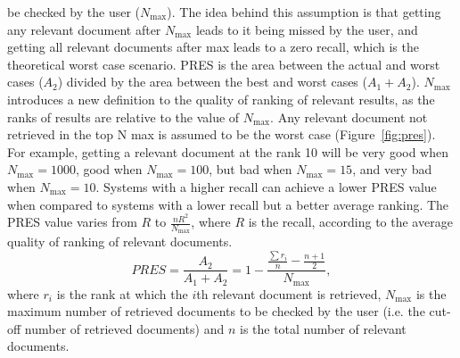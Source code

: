 be checked by the user ($ N_{\max} $). The idea behind this assumption is that getting any relevant document after $ N_{\max} $ leads to it being missed by the user, and getting all relevant documents after max leads to a zero recall, which is the theoretical worst case scenario. 
PRES is the area between the actual and worst cases ($ A_{2} $) divided by the area between the best and worst cases ($ A_{1}+A_{2} $).
$ N_{\max} $ introduces a new definition to the quality of ranking of relevant results, as the ranks of results are relative to the value of $ N_{\max} $. Any relevant document not retrieved in the top N max is assumed to be the worst case (Figure~\ref{fig:pres}).
For example, getting a relevant document at the rank 10 will be very good when $ N_{\max}=1000 $, good when $ N_{\max}=100 $, but bad when $ N_{\max}=15 $, and very bad when $ N_{\max}=10 $. Systems with a higher recall can achieve a lower PRES value when compared to systems with a lower recall but a better average ranking. The PRES value varies from $ R $ to $ \frac{nR^{2}}{N_{\max}} $, where $ R $ is the recall, according to the average quality of ranking of relevant documents.
\begin{equation}
\label{eq:pres}
PRES=\frac{A_{2}}{A_{1}+A_{2}}=1-\frac{\frac{\sum r_{i}}{n}-\frac{n+1}{2}}{N_{\max}},
\end{equation}
where $ r_{i} $ is the rank at which the $ i $th relevant document is retrieved, $ N_{\max} $ is the maximum number of retrieved documents to be checked by the user (i.e. the cut-off number of retrieved documents) and $ n $ is the total number of relevant documents.